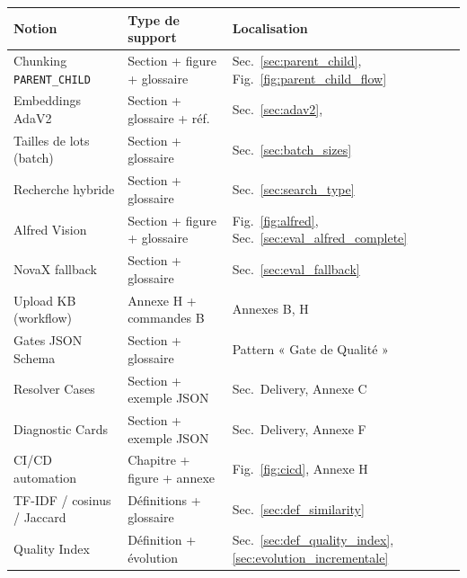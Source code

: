 \documentclass[12pt,a4paper]{report}
\begin{document}
\begin{longtable}{p{3.5cm}p{4cm}p{5cm}}
\toprule
\textbf{Notion} & \textbf{Type de support} & \textbf{Localisation} \\
\midrule
Chunking \texttt{PARENT\_CHILD} & Section + figure + glossaire & Sec.~\ref{sec:parent_child}, Fig.~\ref{fig:parent_child_flow} \\
Embeddings AdaV2 & Section + glossaire + réf. & Sec.~\ref{sec:adav2}, \cite{neelakantan2022embeddings} \\
Tailles de lots (batch) & Section + glossaire & Sec.~\ref{sec:batch_sizes} \\
Recherche hybride & Section + glossaire & Sec.~\ref{sec:search_type} \\
Alfred Vision & Section + figure + glossaire & Fig.~\ref{fig:alfred}, Sec.~\ref{sec:eval_alfred_complete} \\
NovaX fallback & Section + glossaire & Sec.~\ref{sec:eval_fallback} \\
Upload KB (workflow) & Annexe H + commandes B & Annexes B, H \\
Gates JSON Schema & Section + glossaire & Pattern « Gate de Qualité » \\
Resolver Cases & Section + exemple JSON & Sec.~Delivery, Annexe C \\
Diagnostic Cards & Section + exemple JSON & Sec.~Delivery, Annexe F \\
CI/CD automation & Chapitre + figure + annexe & Fig.~\ref{fig:cicd}, Annexe H \\
TF-IDF / cosinus / Jaccard & Définitions + glossaire & Sec.~\ref{sec:def_similarity} \\
Quality Index & Définition + évolution & Sec.~\ref{sec:def_quality_index}, \ref{sec:evolution_incrementale} \\
\bottomrule
\end{longtable}
\end{document}
